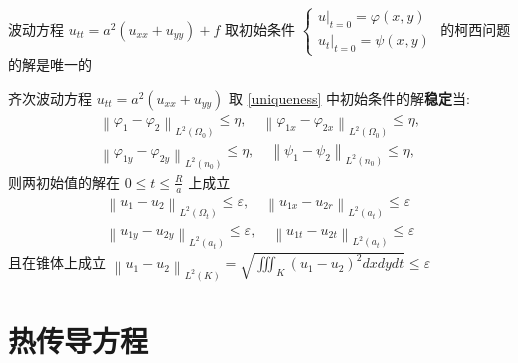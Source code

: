 \documentclass[10pt]{yerbaformat}
\begin{document}
\begin{theorem}
    波动方程 $u_{tt}=a^{2}\left(u_{xx}+u_{y y}\right)+f$ 取初始条件 $\left\{\begin{array}{l}\left.u\right|_{t=0}=\varphi(x, y) \\ \left.u_{t}\right|_{t=0}=\psi(x, y)\end{array}\right.$ 的柯西问题的解是唯一的 \label{uniqueness}
\end{theorem}

\begin{theorem}
    齐次波动方程 $u_{tt}=a^{2}\left(u_{xx}+u_{y y}\right)$ 取 \ref{uniqueness} 中初始条件的解\textbf{稳定}当:
    $$
        \begin{array}{l}
            \left\|\varphi_{1}-\varphi_{2}\right\|_{L^{2}\left(\Omega_{0}\right)} \leqslant \eta, \quad\left\|\varphi_{1 x}-\varphi_{2 x}\right\|_{L^{2}\left(\Omega_{0}\right)} \leqslant \eta, \\
            \left\|\varphi_{1 y}-\varphi_{2 y}\right\|_{L^{2}\left(n_{0}\right)} \leqslant \eta, \quad\left\|\psi_{1}-\psi_{2}\right\|_{L^{2}\left(n_{0}\right)} \leqslant \eta,
        \end{array}
    $$
    则两初始值的解在 $0 \leqslant t \leqslant \frac{R}{a}$ 上成立
    $$
        \begin{array}{l}
            \left\|u_{1}-u_{2}\right\|_{L^{2}\left(\Omega_{t}\right)} \leqslant \varepsilon, \quad\left\|u_{1 x}-u_{2 r}\right\|_{L^{2}\left(a_{t}\right)} \leqslant \varepsilon \\
            \left\|u_{1 y}-u_{2 y}\right\|_{L^{2}\left(a_{t}\right)} \leqslant \varepsilon, \quad\left\|u_{1 t}-u_{2 t}\right\|_{L^{2}\left(a_{t}\right)} \leqslant \varepsilon
        \end{array}
    $$
    且在锥体上成立 $\left\|u_{1}-u_{2}\right\|_{L^{2}(K)}=\sqrt{\iiint_{K}\left(u_{1}-u_{2}\right)^{2} d x d y d t} \leqslant \varepsilon$
\end{theorem}

\section{热传导方程}

\end{document}
